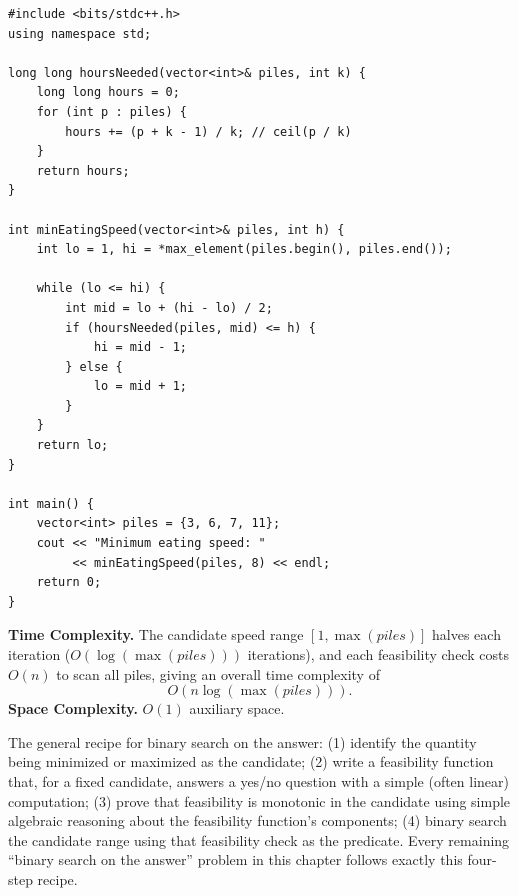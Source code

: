 \begin{lstlisting}
#include <bits/stdc++.h>
using namespace std;

long long hoursNeeded(vector<int>& piles, int k) {
    long long hours = 0;
    for (int p : piles) {
        hours += (p + k - 1) / k; // ceil(p / k)
    }
    return hours;
}

int minEatingSpeed(vector<int>& piles, int h) {
    int lo = 1, hi = *max_element(piles.begin(), piles.end());

    while (lo <= hi) {
        int mid = lo + (hi - lo) / 2;
        if (hoursNeeded(piles, mid) <= h) {
            hi = mid - 1;
        } else {
            lo = mid + 1;
        }
    }
    return lo;
}

int main() {
    vector<int> piles = {3, 6, 7, 11};
    cout << "Minimum eating speed: "
         << minEatingSpeed(piles, 8) << endl;
    return 0;
}
\end{lstlisting}

\begin{complexitybox}
\textbf{Time Complexity.} The candidate speed range $[1, \max(\textit{piles})]$
halves each iteration ($O(\log(\max(\textit{piles})))$ iterations), and
each feasibility check costs $O(n)$ to scan all piles, giving an overall
time complexity of
\[
  O(n \log(\max(\textit{piles}))).
\]
\textbf{Space Complexity.} $O(1)$ auxiliary space.
\end{complexitybox}

\begin{takeawaybox}
The general recipe for binary search on the answer: (1) identify the
quantity being minimized or maximized as the candidate; (2) write a
feasibility function that, for a fixed candidate, answers a yes/no
question with a simple (often linear) computation; (3) prove that
feasibility is monotonic in the candidate using simple algebraic reasoning
about the feasibility function's components; (4) binary search the
candidate range using that feasibility check as the predicate. Every
remaining ``binary search on the answer'' problem in this chapter follows
exactly this four-step recipe.
\end{takeawaybox}
